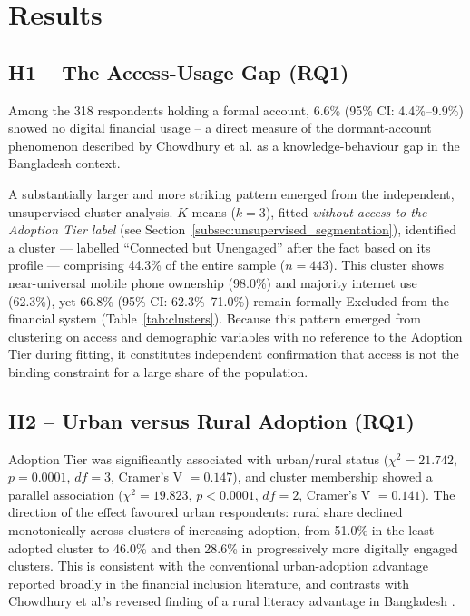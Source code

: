 \documentclass[conference]{IEEEtran}
\begin{document}
\section{Results}
\label{sec:results}
 
\subsection{H1 -- The Access-Usage Gap (RQ1)}
\label{subsec:h1_access_usage_gap_rq1}
Among the 318 respondents holding a formal account, 6.6\% (95\% CI: 4.4\%--9.9\%) showed no digital financial usage -- a direct measure of the dormant-account phenomenon described by Chowdhury et al. \cite{chowdhury2026} as a knowledge-behaviour gap in the Bangladesh context.
 
A substantially larger and more striking pattern emerged from the
independent, unsupervised cluster analysis. $K$-means ($k=3$), fitted
\emph{without access to the Adoption Tier label} (see Section~\ref{subsec:unsupervised_segmentation}),
identified a cluster --- labelled ``Connected but Unengaged'' after the
fact based on its profile --- comprising 44.3\% of the entire sample
($n=443$). This cluster shows near-universal mobile phone ownership
(98.0\%) and majority internet use (62.3\%), yet 66.8\% (95\% CI:
62.3\%--71.0\%) remain formally Excluded from the financial system
(Table~\ref{tab:clusters}). Because this pattern emerged from clustering on access and
demographic variables with no reference to the Adoption Tier during
fitting, it constitutes independent confirmation that access is not the
binding constraint for a large share of the population.

\subsection{H2 -- Urban versus Rural Adoption (RQ1)}
\label{subsec:h2_urban_versus_rural_adoption_rq1}
Adoption Tier was significantly associated with urban/rural status ($\chi^2 = 21.742$, $p = 0.0001$, $\mathit{df} = 3$, Cramer's V $= 0.147$), and cluster membership showed a parallel association ($\chi^2 = 19.823$, $p < 0.0001$, $\mathit{df} = 2$, Cramer's V $= 0.141$). The direction of the effect favoured urban respondents: rural share declined monotonically across clusters of increasing adoption, from 51.0\% in the least-adopted cluster to 46.0\% and then 28.6\% in progressively more digitally engaged clusters. This is consistent with the conventional urban-adoption advantage reported broadly in the financial inclusion literature, and contrasts with Chowdhury et al.'s reversed finding of a rural literacy advantage in Bangladesh \cite{chowdhury2026}.
 
\end{document}
